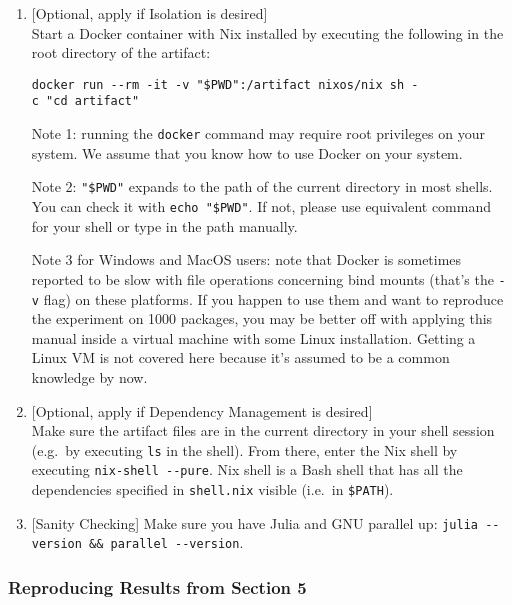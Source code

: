 \documentclass[
]{article}
\begin{document}
\begin{enumerate}
\def\labelenumi{\arabic{enumi}.}
\item
  {[}Optional, apply if Isolation is desired{]}\\
  Start a Docker container with Nix installed by executing the following
  in the root directory of the artifact:

  \texttt{docker\ run\ -\/-rm\ -it\ -v\ "\$PWD":/artifact\ nixos/nix\ sh\ -c\ "cd\ artifact"}

  Note 1: running the \texttt{docker} command may require root
  privileges on your system. We assume that you know how to use Docker
  on your system.

  Note 2: \texttt{"\$PWD"} expands to the path of the current directory
  in most shells. You can check it with \texttt{echo\ "\$PWD"}. If not,
  please use equivalent command for your shell or type in the path
  manually.

  Note 3 for Windows and MacOS users: note that Docker is sometimes
  reported to be slow with file operations concerning bind mounts
  (that's the \texttt{-v} flag) on these platforms. If you happen to use
  them and want to reproduce the experiment on 1000 packages, you may be
  better off with applying this manual inside a virtual machine with
  some Linux installation. Getting a Linux VM is not covered here
  because it's assumed to be a common knowledge by now.
\item
  {[}Optional, apply if Dependency Management is desired{]}\\
  Make sure the artifact files are in the current directory in your
  shell session (e.g.~by executing \texttt{ls} in the shell). From
  there, enter the Nix shell by executing \texttt{nix-shell\ -\/-pure}.
  Nix shell is a Bash shell that has all the dependencies specified in
  \texttt{shell.nix} visible (i.e.~in \texttt{\$PATH}).
\item
  {[}Sanity Checking{]} Make sure you have Julia and GNU parallel up:
  \texttt{julia\ -\/-version\ \&\&\ parallel\ -\/-version}.
\end{enumerate}

\hypertarget{reproducing-results-from-section-5}{%
\subsubsection{Reproducing Results from Section
5}\label{reproducing-results-from-section-5}}
\end{document}
